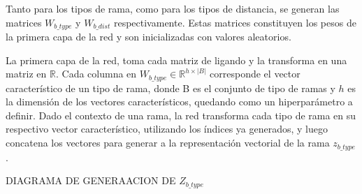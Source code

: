 Tanto para los tipos de rama, como para los tipos de distancia, se
generan las matrices $W_{b\_type}$ y $W_{b\_dist}$ respectivamente. Estas
matrices constituyen los pesos de la primera capa de la red y son
inicializadas con valores aleatorios.

La primera capa de la red, toma cada matriz de ligando y la transforma
en una matriz en $\mathbb{R}$. Cada columna en $W_{b\_type} \in
\mathbb{R}^{h\times |B|}$ corresponde el vector característico de un
tipo de rama, donde B es el conjunto de tipo de ramas y $h$ es la dimensión
de los vectores característicos, quedando como un hiperparámetro a definir.
Dado el contexto de una rama, la red transforma cada tipo de rama en
su respectivo vector característico, utilizando los índices ya generados,
y luego concatena los vectores para generar a la representación vectorial
de la rama $z_{b\_type}$.

DIAGRAMA DE GENERAACION DE $Z_{b\_type}$

